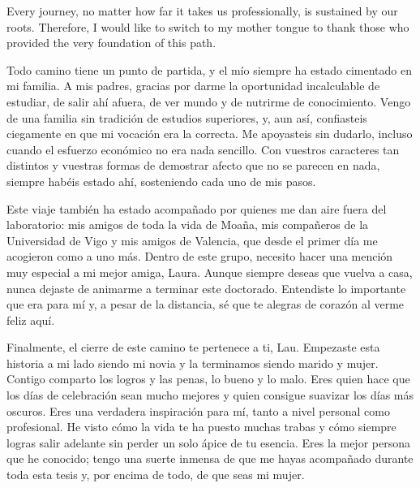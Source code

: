 Every journey, no matter how far it takes us professionally, is sustained by our roots. Therefore, 
I would like to switch to my mother tongue to thank those who provided the very foundation of this 
path.

Todo camino tiene un punto de partida, y el mío siempre ha estado cimentado en mi familia. A mis 
padres, gracias por darme la oportunidad incalculable de estudiar, de salir ahí afuera, de ver 
mundo y de nutrirme de conocimiento. Vengo de una familia sin tradición de estudios superiores, y, 
aun así, confiasteis ciegamente en que mi vocación era la correcta. Me apoyasteis sin dudarlo, 
incluso cuando el esfuerzo económico no era nada sencillo. Con vuestros caracteres tan distintos y 
vuestras formas de demostrar afecto que no se parecen en nada, siempre habéis estado ahí, 
sosteniendo cada uno de mis pasos.

Este viaje también ha estado acompañado por quienes me dan aire fuera del laboratorio: mis amigos 
de toda la vida de Moaña, mis compañeros de la Universidad de Vigo y mis amigos de Valencia, que 
desde el primer día me acogieron como a uno más. Dentro de este grupo, necesito hacer una mención 
muy especial a mi mejor amiga, Laura. Aunque siempre deseas que vuelva a casa, nunca dejaste de 
animarme a terminar este doctorado. Entendiste lo importante que era para mí y, a pesar de la 
distancia, sé que te alegras de corazón al verme feliz aquí.

Finalmente, el cierre de este camino te pertenece a ti, Lau. Empezaste esta historia a mi lado 
siendo mi novia y la terminamos siendo marido y mujer. Contigo comparto los logros y las penas, lo 
bueno y lo malo. Eres quien hace que los días de celebración sean mucho mejores y quien consigue 
suavizar los días más oscuros. Eres una verdadera inspiración para mí, tanto a nivel personal como 
profesional. He visto cómo la vida te ha puesto muchas trabas y cómo siempre logras salir adelante 
sin perder un solo ápice de tu esencia. Eres la mejor persona que he conocido; tengo una suerte 
inmensa de que me hayas acompañado durante toda esta tesis y, por encima de todo, de que seas mi 
mujer.
